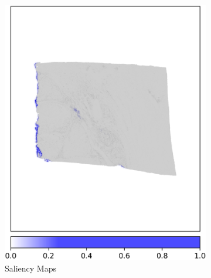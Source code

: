 \begin{figure}[h!t]
\begin{subfigure}[b]{0.49\textwidth}
         \includegraphics[width=\textwidth]{latex/captum/case13/saliency_case13-stain41-dead_2415days.png}
         \caption{Saliency Maps}
     \end{subfigure}
    \hfill
     \begin{subfigure}[b]{0.49\textwidth}
         \centering

\end{subfigure}
\end{figure}
